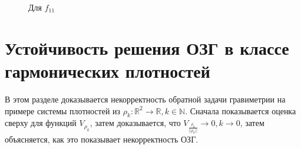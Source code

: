 \documentclass[a4paper, 12pt]{article}
\newcommand{\R}[1]{\mathbb{R}^#1}
\begin{document}
\begin{figure}[h]
\begin{minipage}[h]{0.49\linewidth}
                \end{minipage}
                \caption{Для $f_{11}$}
                \label{d3end}
                \end{figure}
              

\section{Устойчивость решения ОЗГ в классе гармонических плотностей}
В этом разделе доказывается некорректность обратной задачи гравиметрии на примере системы плотностей из $\rho_k: \R{2}\rightarrow \mathbb{R}, k \in \mathbb{N}$.
Сначала показывается оценка сверху для функций $V_{\rho_k}$, затем доказывается, что $V_{\frac{\rho_k}{||\rho_k||}} \rightarrow 0, k \rightarrow 0$, затем объясняется, как это показывает некорректность ОЗГ.
\end{document}
